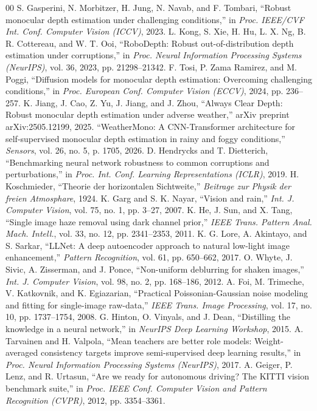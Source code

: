 \documentclass[conference]{IEEEtran}
\begin{document}
\begin{thebibliography}{00}
 S. Gasperini, N. Morbitzer, H. Jung, N. Navab, and F. Tombari, ``Robust monocular depth estimation under challenging conditions,'' in \emph{Proc. IEEE/CVF Int. Conf. Computer Vision (ICCV)}, 2023.
 L. Kong, S. Xie, H. Hu, L. X. Ng, B. R. Cottereau, and W. T. Ooi, ``RoboDepth: Robust out-of-distribution depth estimation under corruptions,'' in \emph{Proc. Neural Information Processing Systems (NeurIPS)}, vol. 36, 2023, pp. 21298--21342.
 F. Tosi, P. Zama Ramirez, and M. Poggi, ``Diffusion models for monocular depth estimation: Overcoming challenging conditions,'' in \emph{Proc. European Conf. Computer Vision (ECCV)}, 2024, pp. 236--257.
 K. Jiang, J. Cao, Z. Yu, J. Jiang, and J. Zhou, ``Always Clear Depth: Robust monocular depth estimation under adverse weather,'' arXiv preprint arXiv:2505.12199, 2025.
 ``WeatherMono: A CNN-Transformer architecture for self-supervised monocular depth estimation in rainy and foggy conditions,'' \emph{Sensors}, vol. 26, no. 5, p. 1705, 2026.
 D. Hendrycks and T. Dietterich, ``Benchmarking neural network robustness to common corruptions and perturbations,'' in \emph{Proc. Int. Conf. Learning Representations (ICLR)}, 2019.
 H. Koschmieder, ``Theorie der horizontalen Sichtweite,'' \emph{Beitrage zur Physik der freien Atmosphare}, 1924.
 K. Garg and S. K. Nayar, ``Vision and rain,'' \emph{Int. J. Computer Vision}, vol. 75, no. 1, pp. 3--27, 2007.
 K. He, J. Sun, and X. Tang, ``Single image haze removal using dark channel prior,'' \emph{IEEE Trans. Pattern Anal. Mach. Intell.}, vol. 33, no. 12, pp. 2341--2353, 2011.
 K. G. Lore, A. Akintayo, and S. Sarkar, ``LLNet: A deep autoencoder approach to natural low-light image enhancement,'' \emph{Pattern Recognition}, vol. 61, pp. 650--662, 2017.
 O. Whyte, J. Sivic, A. Zisserman, and J. Ponce, ``Non-uniform deblurring for shaken images,'' \emph{Int. J. Computer Vision}, vol. 98, no. 2, pp. 168--186, 2012.
 A. Foi, M. Trimeche, V. Katkovnik, and K. Egiazarian, ``Practical Poissonian-Gaussian noise modeling and fitting for single-image raw-data,'' \emph{IEEE Trans. Image Processing}, vol. 17, no. 10, pp. 1737--1754, 2008.
 G. Hinton, O. Vinyals, and J. Dean, ``Distilling the knowledge in a neural network,'' in \emph{NeurIPS Deep Learning Workshop}, 2015.
 A. Tarvainen and H. Valpola, ``Mean teachers are better role models: Weight-averaged consistency targets improve semi-supervised deep learning results,'' in \emph{Proc. Neural Information Processing Systems (NeurIPS)}, 2017.
 A. Geiger, P. Lenz, and R. Urtasun, ``Are we ready for autonomous driving? The KITTI vision benchmark suite,'' in \emph{Proc. IEEE Conf. Computer Vision and Pattern Recognition (CVPR)}, 2012, pp. 3354--3361.
\end{thebibliography}
\end{document}

